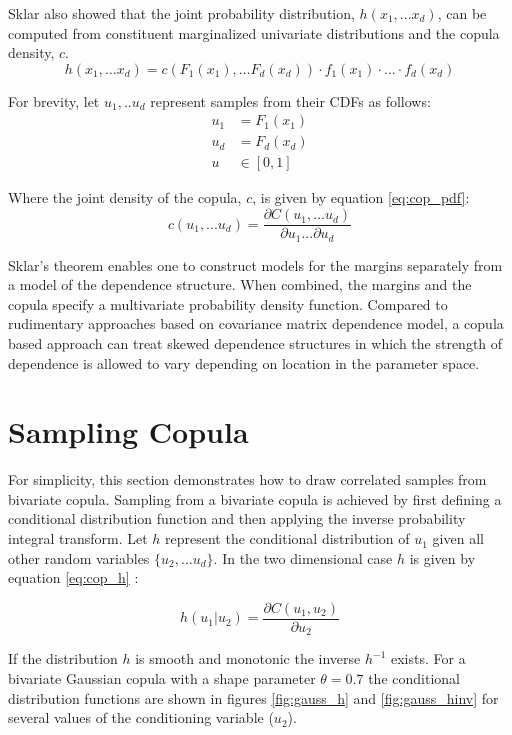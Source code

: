 Sklar also showed that the joint probability distribution, $h(x_1, ... x_d)$, can be computed from
constituent marginalized univariate distributions and the copula density, $c$.
\begin{equation}
h(x_1,\dots x_d)= c(F_1(x_1),\dots F_d(x_d))\cdot f_1(x_1)\cdot\dots\cdot f_d(x_d)
\label{eq:sklar2}
\end{equation}

For brevity, let $u_1, .. u_d$ represent samples from their CDFs as follows:
\begin{align*} u_1 &= F_1(x_1) \\ u_d &= F_d(x_d) \\ u &\in
[0, 1]
\end{align*}

Where the joint density of the copula, $c$, is given by equation \ref{eq:cop_pdf}:
\begin{equation}
c(u_1, ... u_d) = \frac{\partial C(u_1, ... u_d)}{\partial u_1 ... \partial u_d}
\label{eq:cop_pdf}
\end{equation}

Sklar's theorem enables one to construct
models for the margins separately from a model of the dependence structure.
When combined, the margins and the copula 
specify a multivariate probability density function.
Compared to rudimentary approaches based on covariance matrix dependence model,
a copula based approach can treat skewed dependence structures in which the
strength of dependence is allowed to vary depending on location in the parameter space.

\section*{Sampling Copula}

For simplicity, this section demonstrates how to draw correlated samples from bivariate copula.
Sampling from a bivariate copula is achieved by first defining a conditional distribution function and then applying the inverse probability integral transform.
Let $h$ represent the conditional distribution of $u_1$ given all other random variables $\{u_2, ... u_d\}$.  In the two dimensional case $h$ is given by equation \ref{eq:cop_h} \cite{Nelsen2006}:

\begin{equation}
h(u_1 | u_2) = \frac{\partial C(u_1, u_2)}{\partial u_2}
\label{eq:cop_h}
\end{equation}

If the distribution $h$ is smooth and monotonic the inverse $h^{-1}$ exists.  For a bivariate Gaussian copula with a shape parameter $\theta=0.7$ the conditional distribution functions are shown in figures \ref{fig:gauss_h} and \ref{fig:gauss_hinv} for several values of the conditioning variable ($u_2$).  

